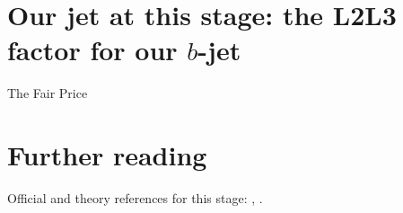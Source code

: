 \section{Our jet at this stage: the L2L3 factor for our $b$-jet}
\label{sec:fair_price:our_jet_at_this_stage_the_l2l3_factor_fo}

\begin{ledger}{The Fair Price}
\end{ledger}

\section{Further reading}
\label{sec:fair_price:further_reading}
Official and theory references for this stage: \cite{CMS:2016lmd}, \cite{CMS:2011krm}.

\begin{pitfalls}
\end{pitfalls}

\begin{exercises}
\item {}
\item {}
\end{exercises}

